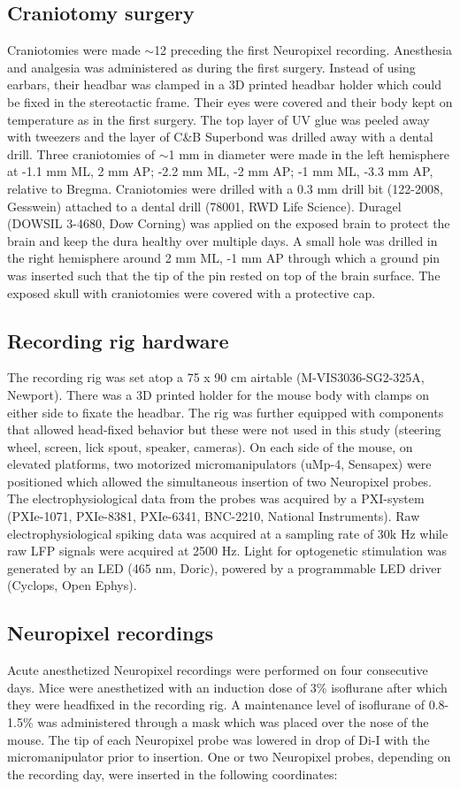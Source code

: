 \documentclass[11pt,a4paper,onecolumn]{article}
\begin{document}
\subsection*{Craniotomy surgery}
Craniotomies were made $\sim$12 preceding the first Neuropixel recording. Anesthesia and analgesia was administered as during the first surgery. Instead of using earbars, their headbar was clamped in a 3D printed headbar holder which could be fixed in the stereotactic frame. Their eyes were covered and their body kept on temperature as in the first surgery. The top layer of UV glue was peeled away with tweezers and the layer of C\&B Superbond was drilled away with a dental drill. Three craniotomies of $\sim$1 mm in diameter were made in the left hemisphere at -1.1 mm ML, 2 mm AP; -2.2 mm ML, -2 mm AP; -1 mm ML, -3.3 mm AP, relative to Bregma. Craniotomies were drilled with a 0.3 mm drill bit (122-2008, Gesswein) attached to a dental drill (78001, RWD Life Science). Duragel (DOWSIL 3-4680, Dow Corning) was applied on the exposed brain to protect the brain and keep the dura healthy over multiple days. A small hole was drilled in the right hemisphere around 2 mm ML, -1 mm AP through which a ground pin was inserted such that the tip of the pin rested on top of the brain surface. The exposed skull with craniotomies were covered with a protective cap.

\subsection*{Recording rig hardware}
The recording rig was set atop a 75 x 90 cm airtable (M-VIS3036-SG2-325A, Newport). There was a 3D printed holder for the mouse body with clamps on either side to fixate the headbar. The rig was further equipped with components that allowed head-fixed behavior but these were not used in this study (steering wheel, screen, lick spout, speaker, cameras). On each side of the mouse, on elevated platforms, two motorized micromanipulators (uMp-4, Sensapex) were positioned which allowed the simultaneous insertion of two Neuropixel probes. The electrophysiological data from the probes was acquired by a PXI-system (PXIe-1071, PXIe-8381, PXIe-6341, BNC-2210, National Instruments). Raw electrophysiological spiking data was acquired at a sampling rate of 30k Hz while raw LFP signals were acquired at 2500 Hz. Light for optogenetic stimulation was generated by an LED (465 nm, Doric), powered by a programmable LED driver (Cyclops, Open Ephys).

\subsection*{Neuropixel recordings}
Acute anesthetized Neuropixel recordings were performed on four consecutive days. Mice were anesthetized with an induction dose of 3\% isoflurane after which they were headfixed in the recording rig. A maintenance level of isoflurane of 0.8-1.5\% was administered through a mask which was placed over the nose of the mouse. The tip of each Neuropixel probe was lowered in drop of Di-I with the micromanipulator prior to insertion. One or two Neuropixel probes, depending on the recording day, were inserted in the following coordinates:
\end{document}
